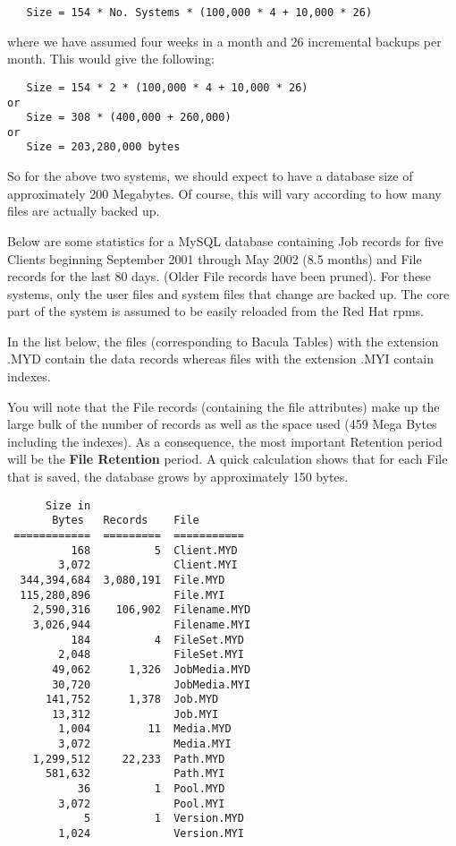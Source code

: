 \footnotesize
\begin{verbatim}
   Size = 154 * No. Systems * (100,000 * 4 + 10,000 * 26)
\end{verbatim}
\normalsize

where we have assumed four weeks in a month and 26 incremental backups per month.
This would give the following: 

\footnotesize
\begin{verbatim}
   Size = 154 * 2 * (100,000 * 4 + 10,000 * 26)
or
   Size = 308 * (400,000 + 260,000)
or
   Size = 203,280,000 bytes
\end{verbatim}
\normalsize

So for the above two systems, we should expect to have a database size of
approximately 200 Megabytes. Of course, this will vary according to how many
files are actually backed up. 

Below are some statistics for a MySQL database containing Job records for five
Clients beginning September 2001 through May 2002 (8.5 months) and File
records for the last 80 days. (Older File records have been pruned). For these
systems, only the user files and system files that change are backed up. The
core part of the system is assumed to be easily reloaded from the Red Hat rpms.


In the list below, the files (corresponding to Bacula Tables) with the
extension .MYD contain the data records whereas files with the extension .MYI
contain indexes. 

You will note that the File records (containing the file attributes) make up
the large bulk of the number of records as well as the space used (459 Mega
Bytes including the indexes). As a consequence, the most important Retention
period will be the {\bf File Retention} period. A quick calculation shows that
for each File that is saved, the database grows by approximately 150 bytes. 

\footnotesize
\begin{verbatim}
      Size in
       Bytes   Records    File
 ============  =========  ===========
          168          5  Client.MYD
        3,072             Client.MYI
  344,394,684  3,080,191  File.MYD
  115,280,896             File.MYI
    2,590,316    106,902  Filename.MYD
    3,026,944             Filename.MYI
          184          4  FileSet.MYD
        2,048             FileSet.MYI
       49,062      1,326  JobMedia.MYD
       30,720             JobMedia.MYI
      141,752      1,378  Job.MYD
       13,312             Job.MYI
        1,004         11  Media.MYD
        3,072             Media.MYI
    1,299,512     22,233  Path.MYD
      581,632             Path.MYI
           36          1  Pool.MYD
        3,072             Pool.MYI
            5          1  Version.MYD
        1,024             Version.MYI
\end{verbatim}
\normalsize

